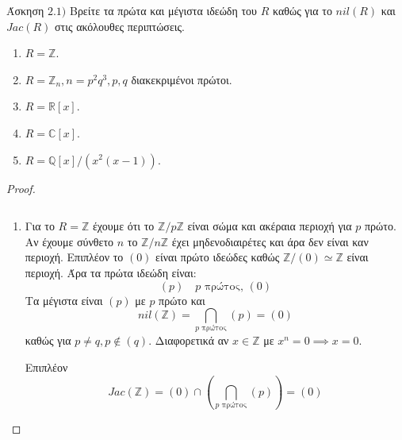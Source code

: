 \documentclass[oneside,a4paper]{article}
\newcommand{\Z}{\mathbb{Z}}
\begin{document}
\noindent Άσκηση $2.1)$
\quad Βρείτε τα πρώτα και μέγιστα ιδεώδη του $R$ καθώς για το $nil(R)$ και $Jac(R)$ στις ακόλουθες περιπτώσεις.
\begin{enumerate}
    \item $R = \Z$.
    \item $R = \Z_n, n=p^2q^3, p,q$ διακεκριμένοι πρώτοι.
    \item $R = \mathbb{R}[x]$.
    \item $R = \mathbb{C}[x]$.
    \item $R = \mathbb{Q}[x]/(x^2(x-1))$.
\end{enumerate}
\begin{proof} $ $

	$ $\newline

	\begin{enumerate}
		\item Για το $R=\Z$ έχουμε ότι το $\Z / p\Z$ είναι σώμα και ακέραια περιοχή για $p$ πρώτο. Αν έχουμε σύνθετο $n$ το $\Z / n \Z$ έχει μηδενοδιαιρέτες και άρα δεν είναι καν περιοχή. Επιπλέον το $(0)$ είναι πρώτο ιδεώδες καθώς $\Z / (0) \simeq \Z$ είναι περιοχή.
		Άρα τα πρώτα ιδεώδη είναι:
		$$(p) \quad p \text{ πρώτος, } (0) $$
		Τα μέγιστα είναι $(p)$ με $p$ πρώτο και
		$$nil(\Z) = \bigcap\limits_{p \text{ πρώτος}} (p) = (0)$$
		καθώς για $p\neq q, p \not\in (q)$. Διαφορετικά αν $x \in \Z$ με $x^n = 0 \implies x = 0$.

		Επιπλέον
		$$Jac(\Z) = (0) \cap \left(\bigcap\limits_{p \text{ πρώτος}} (p)\right) = (0)$$


\end{enumerate}
\end{proof}
\end{document}
